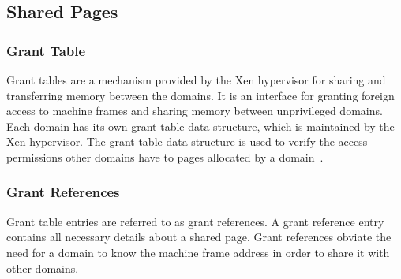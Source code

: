 \subsection*{Shared Pages}
\label{subsec:sharedpages}
\subsubsection*{Grant Table} 

Grant tables are a mechanism provided by the Xen hypervisor for sharing
and transferring memory between the domains. It is an interface for
granting foreign access to machine frames and sharing memory between
unprivileged domains. Each domain has its own grant table data structure,
which is maintained by the Xen hypervisor. The grant table data structure
is used to verify the access permissions other domains have to pages
allocated by a domain~\cite{granttable}.

\subsubsection*{Grant References}

Grant table entries are referred to as grant references. A grant reference
entry contains all necessary details about a shared page.
Grant references obviate the need for a domain to know the machine
frame address in order to share it with other 
domains.\cite{Chisnall:2007:DGX:1407351,barham2003xen,granttable}

